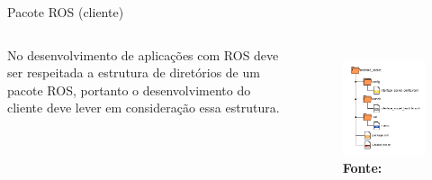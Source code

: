 \documentclass[10pt]{beamer}
\begin{document}

\begin{frame}{Pacote ROS (cliente)}
    \begin{alertblock}{}
		\begin{columns}
				No desenvolvimento de aplicações com ROS deve ser respeitada a estrutura de
				diretórios de um pacote ROS, portanto o desenvolvimento do cliente deve lever em consideração essa estrutura.
			\begin{figure}[h]
				\begin{center}
					\includegraphics[scale=0.4]{imagens/rospackage.png}\\
					{\footnotesize \textbf{Fonte:}}
				\end{center}
				\label{fig:pkg}
			\end{figure}
		\end{columns}
	\end{alertblock}
\end{frame}
\end{document}
